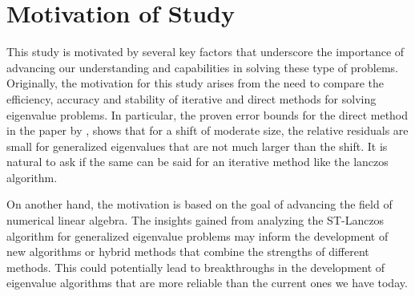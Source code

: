 \section{Motivation of Study}\label{sec:MotivationOfStudy}

This study is motivated by several key factors that underscore the importance of advancing our understanding and capabilities in solving these type of problems. Originally, the motivation for this study arises from the need to compare the efficiency, accuracy and stability of iterative and direct methods for solving eigenvalue problems. In particular, the proven error bounds for the direct method in the paper by \cite{stewart2024spectraltransformationdensesymmetric}, shows that for a shift of moderate size, the relative residuals are small for generalized eigenvalues that are not much larger than the shift. It is natural to ask if the same can be said for an iterative method like the lanczos algorithm.

On another hand, the motivation is based on the goal of advancing the field of numerical linear algebra. The insights gained from analyzing the ST-Lanczos algorithm for generalized eigenvalue problems may inform the development of new algorithms or hybrid methods that combine the strengths of different methods. This could potentially lead to breakthroughs in the development of eigenvalue algorithms that are more reliable than the current ones we have today.


